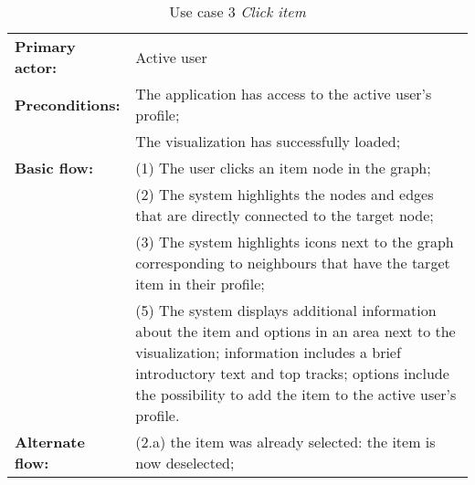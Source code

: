 \begin{table}[h]
\caption{Use case 3 \textit{Click item}}
\begin{center}
	\begin{tabular}{ l p{300px} }
		\hline
		\textbf{Primary actor:}	& Active user \\
		
		\textbf{Preconditions:}	& The application has access to the active user's profile; \\
														& The visualization has successfully loaded; \\
		
		\textbf{Basic flow:}	& (1) The user clicks an item node in the graph; \\
													& (2) The system highlights the nodes and edges that are directly connected to the target node; \\
													& (3) The system highlights icons next to the graph corresponding to neighbours that have the target item in their profile; \\
													& (5) The system displays additional information about the item and options in an area next to the visualization; information includes a brief introductory text and top tracks; options include the possibility to add the item to the active user's profile. \\
		
		\textbf{Alternate flow:}	& (2.a) the item was already selected: the item is now deselected; \\
		
		\hline
	\end{tabular}
\end{center}
\label{tab:use_case3}
\end{table}


